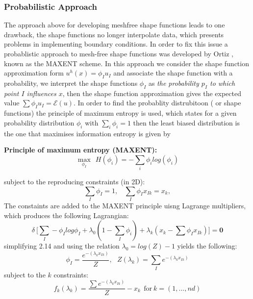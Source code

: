 \subsubsection*{Probabilistic Approach}
The approach above for developing meshfree shape functions leads to one drawback, the shape functions no longer interpolate data, which presents problems in implementing boundary conditions. In order to fix this issue a probablistic approach to mesh-free shape functions was developed by Ortiz \cite{}, known as the MAXENT scheme. In this approach we consider the shape function approximation form $u^h(x) = \phi_I u_I$ and associate the shape function with a probability, we interpret the shape functions $\phi_I$ as \emph{the probability $p_I$ to which point $I$ influences $x$}, then the shape function approximation gives the expected value $\sum \phi_I u_I = \mathcal{E}(u)$. In order to find the probablity distrubitoon ( or shape functions) the principle of maximum entropy is used, which states for a given probability distribution $\phi_i$ with $\sum_i \phi_i = 1$ then the least biased distribution is the one that maximises information entropy is given by 
\begin{tcolorbox}
\textbf{Principle of maximum entropy (MAXENT):}
\begin{equation*}
\max_{\phi_I} ~~H(\phi_i) = - \sum_i \phi_i log(\phi_i)
\end{equation*}
\end{tcolorbox}
\noindent subject to the reproducing constraints (in 2D):
\begin{equation*}
\sum_I \phi_I = 1, ~~~~\sum_I \phi_I x_{Ik} = x_k, 
\end{equation*}
The constaints are added to the MAXENT principle uisng Lagrange multipliers, which produces the following Lagrangian:
\begin{equation}
\delta ~\bigg[\sum_I -\phi_I log \phi_I + \lambda_0 ( 1- \sum_I \phi_i)+ \lambda_k ( x_k- \sum \phi_I x_{Ik})\bigg]  = \mathbf{0}
\end{equation}
simplifying 2.14 and using the relation $ \lambda_0 = log(Z) - 1$ yields the following:
\begin{equation}
\phi_I = \frac{e^{-( \lambda_k x_{Ik})    }}{Z}, ~~~ Z(\lambda_k) = \sum_I e^{-( \lambda_k x_{Ik})    }
\end{equation}
subject to the $k$ constraints:
\begin{equation}
f_k(\lambda_k) = \frac{\sum e^{-( \lambda_k x_{Ik})    }}{Z} - x_k ~~ \text{for} ~k = (1,...,nd)
\end{equation}
